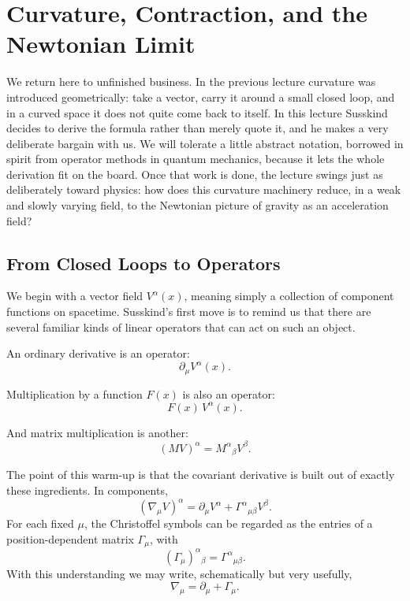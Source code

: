 \chapter{Curvature, Contraction, and the Newtonian Limit}

We return here to unfinished business. In the previous lecture curvature was introduced geometrically: take a vector, carry it around a small closed loop, and in a curved space it does not quite come back to itself. In this lecture Susskind decides to derive the formula rather than merely quote it, and he makes a very deliberate bargain with us. We will tolerate a little abstract notation, borrowed in spirit from operator methods in quantum mechanics, because it lets the whole derivation fit on the board. Once that work is done, the lecture swings just as deliberately toward physics: how does this curvature machinery reduce, in a weak and slowly varying field, to the Newtonian picture of gravity as an acceleration field?

\section{From Closed Loops to Operators}

We begin with a vector field \(V^\alpha(x)\), meaning simply a collection of component functions on spacetime. Susskind's first move is to remind us that there are several familiar kinds of linear operators that can act on such an object.

An ordinary derivative is an operator:
\begin{equation}
\partial_\mu V^\alpha(x).
\end{equation}

Multiplication by a function \(F(x)\) is also an operator:
\begin{equation}
F(x)\,V^\alpha(x).
\end{equation}

And matrix multiplication is another:
\begin{equation}
(MV)^\alpha = M^\alpha{}_\beta V^\beta.
\end{equation}

The point of this warm-up is that the covariant derivative is built out of exactly these ingredients. In components,
\begin{equation}
(\nabla_\mu V)^\alpha
=
\partial_\mu V^\alpha
+
\Gamma^\alpha{}_{\mu\beta}V^\beta.
\end{equation}
For each fixed \(\mu\), the Christoffel symbols can be regarded as the entries of a position-dependent matrix \(\Gamma_\mu\), with
\begin{equation}
(\Gamma_\mu)^\alpha{}_\beta = \Gamma^\alpha{}_{\mu\beta}.
\end{equation}
With this understanding we may write, schematically but very usefully,
\begin{equation}
\nabla_\mu = \partial_\mu + \Gamma_\mu.
\end{equation}

